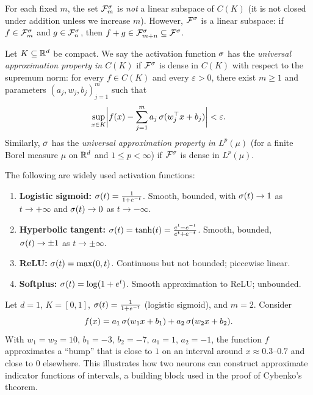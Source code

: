 \documentclass[11pt,a4paper]{article}
\begin{document}
\begin{remark}
\label{rem:linear-span}
For each fixed $m$, the set $\mathcal{F}_m^{\sigma}$ is \emph{not} a linear
subspace of $C(K)$ (it is not closed under addition unless we increase $m$).
However, $\mathcal{F}^{\sigma}$ is a linear subspace: if $f \in
\mathcal{F}_m^{\sigma}$ and $g \in \mathcal{F}_n^{\sigma}$, then
$f + g \in \mathcal{F}_{m+n}^{\sigma} \subseteq \mathcal{F}^{\sigma}$.
\end{remark}

\begin{definition}
\label{def:universal-approx}
Let $K \subseteq \mathbb{R}^d$ be compact.  We say the activation function
$\sigma$ has the \emph{universal approximation property in $C(K)$} if
$\mathcal{F}^{\sigma}$ is dense in $C(K)$ with respect to the supremum norm:
for every $f \in C(K)$ and every $\varepsilon > 0$, there exist $m \ge 1$
and parameters $(a_j, w_j, b_j)_{j=1}^m$ such that
\[
  \sup_{x \in K}
  \biggl| f(x) - \sum_{j=1}^{m} a_j \, \sigma(w_j^\top x + b_j) \biggr|
  < \varepsilon.
\]
Similarly, $\sigma$ has the \emph{universal approximation property in
$L^p(\mu)$} (for a finite Borel measure $\mu$ on $\mathbb{R}^d$ and $1 \le p <
\infty$) if $\mathcal{F}^{\sigma}$ is dense in $L^p(\mu)$.
\end{definition}

\begin{example}
\label{ex:activations}
The following are widely used activation functions:
\begin{enumerate}[nosep,label=(\roman*)]
  \item \textbf{Logistic sigmoid:} $\sigma(t) = \frac{1}{1 + e^{-t}}$.
    Smooth, bounded, with $\sigma(t) \to 1$ as $t \to +\infty$ and
    $\sigma(t) \to 0$ as $t \to -\infty$.
  \item \textbf{Hyperbolic tangent:} $\sigma(t) = \tanh(t) =
    \frac{e^t - e^{-t}}{e^t + e^{-t}}$.  Smooth, bounded,
    $\sigma(t) \to \pm 1$ as $t \to \pm\infty$.
  \item \textbf{ReLU:} $\sigma(t) = \max(0, t)$.  Continuous but not
    bounded; piecewise linear.
  \item \textbf{Softplus:} $\sigma(t) = \log(1 + e^t)$.  Smooth
    approximation to ReLU; unbounded.
\end{enumerate}
\end{example}

\begin{example}
\label{ex:simple-net}
Let $d = 1$, $K = [0,1]$, $\sigma(t) = \frac{1}{1+e^{-t}}$ (logistic
sigmoid), and $m = 2$.  Consider
\[
  f(x) = a_1 \, \sigma(w_1 x + b_1) + a_2 \, \sigma(w_2 x + b_2).
\]
With $w_1 = w_2 = 10$, $b_1 = -3$, $b_2 = -7$, $a_1 = 1$, $a_2 = -1$,
the function $f$ approximates a ``bump'' that is close to $1$ on an
interval around $x \approx 0.3$--$0.7$ and close to $0$ elsewhere.  This
illustrates how two neurons can construct approximate indicator functions of
intervals, a building block used in the proof of Cybenko's theorem.
\end{example}
\end{document}
